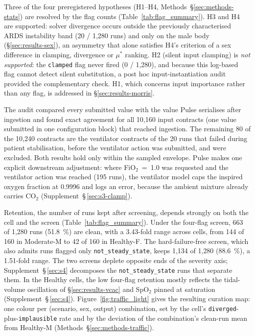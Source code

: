 \documentclass[pdflatex,sn-nature]{sn-jnl}%
\begin{document}
Three of the four preregistered hypotheses (H1--H4, Methods~\S\ref{sec:methods-stats}) are resolved by the flag counts (Table~\ref{tab:flag_summary}). H3 and H4 are supported: solver divergence occurs outside the previously characterised ARDS instability band (20 / 1{,}280 runs) and only on the male body (\S\ref{sec:results-sex}), an asymmetry that alone satisfies H4's criterion of a sex difference in clamping, divergence or $\mu^{*}$ ranking. H2 (silent input clamping) is \emph{not supported}: the \texttt{clamped} flag never fired (0 / 1{,}280), and because this log-based flag cannot detect silent substitution, a post hoc input-instantiation audit provided the complementary check. H1, which concerns input importance rather than any flag, is addressed in \S\ref{sec:results-morris}.

The audit compared every submitted value with the value Pulse serialises after ingestion and found exact agreement for all 10{,}160 input contracts (one value submitted in one configuration block) that reached ingestion. The remaining 80 of the 10{,}240 contracts are the ventilator contracts of the 20 runs that failed during patient stabilisation, before the ventilator action was submitted, and were excluded. Both results hold only within the sampled envelope. Pulse makes one explicit downstream adjustment: where FiO$_2$~=~1.0 was requested and the ventilator action was reached (195 runs), the ventilator model caps the inspired oxygen fraction at 0.9996 and logs an error, because the ambient mixture already carries CO$_2$ (Supplement~\S\,\ref{sec:s3-clamp}).

Retention, the number of runs kept after screening, depends strongly on both the cell and the screen (Table~\ref{tab:flag_summary}). Under the four-flag screen, 663 of 1{,}280 runs (51.8~\%) are clean, with a 3.43-fold range across cells, from 144 of 160 in Moderate-M to 42 of 160 in Healthy-F. The hard-failure-free screen, which also admits runs flagged only \texttt{not\_steady\_state}, keeps 1{,}134 of 1{,}280 (88.6~\%), a 1.51-fold range. The two screens deplete opposite ends of the severity axis; Supplement~\S\,\ref{sec:s4} decomposes the \texttt{not\_steady\_state} runs that separate them. In the Healthy cells, the low four-flag retention mostly reflects the tidal-volume oscillation of \S\ref{sec:results-vcac} and SpO$_2$ pinned at saturation (Supplement~\S\,\ref{sec:s4}). Figure~\ref{fig:traffic_light} gives the resulting curation map: one colour per (scenario, sex, output) combination, set by the cell's \texttt{diverged}-plus-\texttt{implausible} rate and by the deviation of the combination's clean-run mean from Healthy-M (Methods~\S\ref{sec:methods-traffic}).
\end{document}
